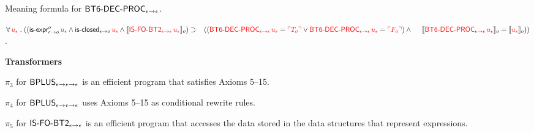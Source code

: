 \documentclass[fleqn]{llncs}
\begin{document}
\begin{biformthy}
    \item Meaning formula for $\mbox{\sf BT6-DEC-PROC}_{\epsilon \rightarrow \epsilon}$.

    $\forall\, \textcolor{red}{u_\epsilon} \mathrel. 
    ((\mbox{\sf is-expr}_{\epsilon \rightarrow o}^{o} \, 
    \textcolor{red}{u_\epsilon}  \wedge
    \mbox{\sf is-closed}_{\epsilon \rightarrow o} \, \textcolor{red}{u_\epsilon} \wedge 
    \llbracket\textcolor{red}{\mbox{\sf IS-FO-BT2}_{\epsilon \rightarrow \epsilon} \, 
    u_\epsilon}\rrbracket_o) \supset {}\\
    \hspace*{2ex}((\textcolor{red}{\mbox{\sf BT6-DEC-PROC}_{\epsilon \rightarrow \epsilon} \, u_\epsilon} = 
    \textcolor{red}{\ulcorner T_o\urcorner} \vee 
    \textcolor{red}{\mbox{\sf BT6-DEC-PROC}_{\epsilon \rightarrow \epsilon} \, u_\epsilon} = 
    \textcolor{red}{\ulcorner F_o\urcorner}) \wedge {}\\
    \hspace*{3.1ex}
    \llbracket\textcolor{red}{\mbox{\sf BT6-DEC-PROC}_{\epsilon \rightarrow \epsilon} \, u_\epsilon}\rrbracket_o =
    \llbracket\textcolor{red}{u_\epsilon}\rrbracket_o))$.

  \ee

  \item[] \textbf{Transformers}

  \be

    \iffalse

    \item $\pi_1$ for $\mname{IS-FO-BT1}_{\epsilon \tarrow \epsilon}$
      is an efficient program that accesses the data stored in the
      data structures that represent expressions.

    \item $\pi_2$ for $\mname{IS-FO-BT1}_{\epsilon \tarrow \epsilon}$
      uses the definition of $\mname{IS-FO-BT1}_{\epsilon \tarrow
        \epsilon}$.  

    \fi

    \setcounter{enumi}{2}

    \item $\pi_3$ for $\mbox{\sf BPLUS}_{\epsilon \rightarrow \epsilon
      \rightarrow \epsilon}$ is an efficient program that satisfies Axioms
      5--15.

    \item $\pi_4$ for $\mbox{\sf BPLUS}_{\epsilon \rightarrow \epsilon
      \rightarrow \epsilon}$ uses Axioms 5--15 as conditional rewrite
      rules.

    \item $\pi_5$ for $\mbox{\sf IS-FO-BT2}_{\epsilon \rightarrow
      \epsilon}$ is an efficient program that accesses the data
      stored in the data structures that represent expressions.


\end{biformthy}
\end{document}
